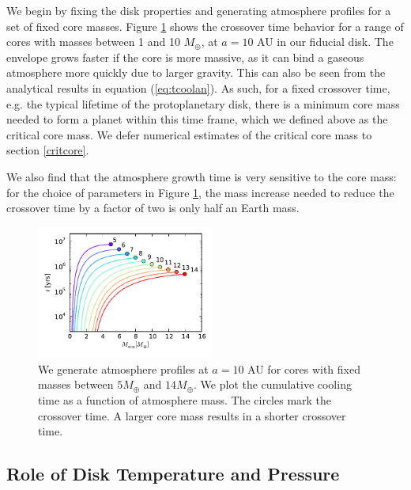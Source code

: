 \documentclass[apj]{emulateapj}
\begin{document}
We begin by fixing the disk properties and generating atmosphere profiles for a set of fixed core masses. Figure \ref{fig:tvsM} shows the crossover time behavior for a range of cores with masses between 1 and 10 $M_{\oplus}$, at $a=10$ AU in our fiducial disk. The envelope grows faster if the core is more massive, as it can bind a gaseous atmosphere more quickly due to larger gravity. This can also be seen from the analytical results in equation (\ref{eq:tcoolan}). As such, for a fixed crossover time, e.g. the typical lifetime of the protoplanetary disk, there is a minimum core mass needed to form a planet within this time frame, which we defined above as the critical core mass. We defer numerical estimates of the critical core mass to section \ref{critcore}.

We also find that the atmosphere growth time is very sensitive to the core mass: for the choice of parameters in Figure \ref{fig:tvsM}, the mass increase needed to reduce the crossover time by a factor of two is only half an Earth mass. 



\begin{figure}[h]
\centering
\includegraphics[width=0.52\textwidth]{../../figs/ModelAtmospheres/RadSelfGravPoly/PaperFigs/cumul_coolingtime_vs_Matm_10au_mu235.pdf}
\caption{We generate atmosphere profiles at $a=10$ AU for cores with fixed masses between $5 M_{\oplus}$ and $14 M_{\oplus}$. We plot the cumulative cooling time as a function of atmosphere mass. The circles mark the crossover time. A larger core mass results in a shorter crossover time.}
\label{fig:tvsM}
\end{figure}



\subsection{Role of Disk Temperature and Pressure}
\label{TPeffects}
 
\end{document}
